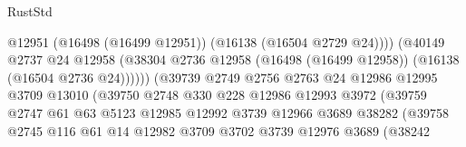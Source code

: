 \begin{lexlean}{RustStd}
\begin{coremodule}
                                              @12951
                                              (@16498 (@16499 @12951))
                                              (@16138 (@16504 @2729 @24))))
                                          (@40149
                                            @2737
                                            @24
                                            @12958
                                            (@38304
                                              @2736
                                              @12958
                                              (@16498 (@16499 @12958))
                                              (@16138 (@16504 @2736 @24))))))
                                      (@39739
                                        @2749
                                        @2756
                                        @2763
                                        @24
                                        @12986
                                        @12995
                                        @3709
                                        @13010
                                        (@39750
                                          @2748
                                          @330
                                          @228
                                          @12986
                                          @12993
                                          @3972
                                          (@39759
                                            @2747
                                            @61
                                            @63
                                            @5123
                                            @12985
                                            @12992
                                            @3739
                                            @12966
                                            @3689
                                            @38282
                                            (@39758
                                              @2745
                                              @116
                                              @61
                                              @14
                                              @12982
                                              @3709
                                              @3702
                                              @3739
                                              @12976
                                              @3689
                                              (@38242

\end{coremodule}
\end{lexlean}
